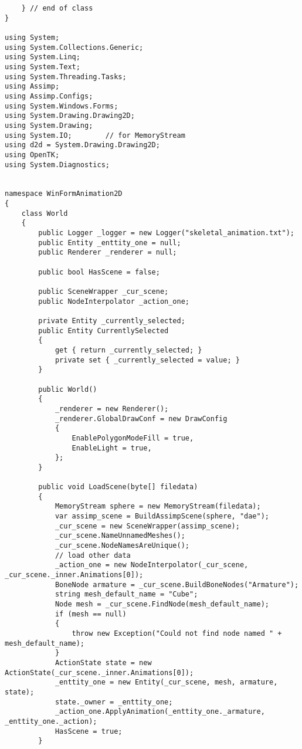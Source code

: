 \begin{scriptsize}
\begin{verbatim}
    } // end of class
}

using System;
using System.Collections.Generic;
using System.Linq;
using System.Text;
using System.Threading.Tasks;
using Assimp;
using Assimp.Configs;
using System.Windows.Forms;
using System.Drawing.Drawing2D;
using System.Drawing;
using System.IO;        // for MemoryStream
using d2d = System.Drawing.Drawing2D;
using OpenTK;
using System.Diagnostics;


namespace WinFormAnimation2D
{
    class World
    {
        public Logger _logger = new Logger("skeletal_animation.txt");
        public Entity _enttity_one = null;
        public Renderer _renderer = null;

        public bool HasScene = false;

        public SceneWrapper _cur_scene;
        public NodeInterpolator _action_one;

        private Entity _currently_selected;
        public Entity CurrentlySelected
        {
            get { return _currently_selected; }
            private set { _currently_selected = value; }
        }

        public World()
        {
            _renderer = new Renderer();
            _renderer.GlobalDrawConf = new DrawConfig
            {
                EnablePolygonModeFill = true,
                EnableLight = true,
            };
        }

        public void LoadScene(byte[] filedata)
        {
            MemoryStream sphere = new MemoryStream(filedata);
            var assimp_scene = BuildAssimpScene(sphere, "dae"); 
            _cur_scene = new SceneWrapper(assimp_scene);
            _cur_scene.NameUnnamedMeshes();
            _cur_scene.NodeNamesAreUnique();
            // load other data
            _action_one = new NodeInterpolator(_cur_scene, _cur_scene._inner.Animations[0]);
            BoneNode armature = _cur_scene.BuildBoneNodes("Armature");
            string mesh_default_name = "Cube";
            Node mesh = _cur_scene.FindNode(mesh_default_name);
            if (mesh == null)
            {
                throw new Exception("Could not find node named " + mesh_default_name);
            }
            ActionState state = new ActionState(_cur_scene._inner.Animations[0]);
            _enttity_one = new Entity(_cur_scene, mesh, armature, state);
            state._owner = _enttity_one;
            _action_one.ApplyAnimation(_enttity_one._armature, _enttity_one._action);
            HasScene = true;
        }


\end{verbatim}
\end{scriptsize}
